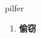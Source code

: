 
\begin{frame}
{\huge pilfer}
\begin{center}
\begin{enumerate}\Large
  \item \textbf{偷窃}
\end{enumerate}
\end{center}
\end{frame}
